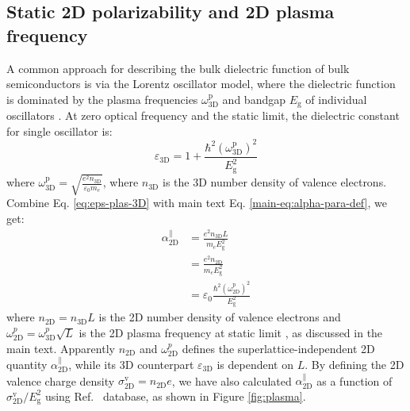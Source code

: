 \documentclass[manuscript=suppinfo,email=true,hyperref=true,keywords=false]{achemso}
\begin{document}
\subsection{Static 2D polarizability and 2D plasma frequency}
\label{ssec:omega-p}

A common approach for describing the bulk dielectric function of bulk
semiconductors is via the Lorentz oscillator model, where the
dielectric function is dominated by the plasma frequencies
$\omega_{\mathrm{3D}}^{\mathrm{p}}$ and bandgap $E_{\mathrm{g}}$ of
individual oscillators \cite{ketterson_physics_2016}. At zero optical
frequency and the static limit, the dielectric constant for single
oscillator is:
\begin{equation}
  \label{eq:eps-plas-3D}
  \varepsilon_{\mathrm{3D}} = 1 +
  \frac{\hbar^{2} (\omega_{\mathrm{3D}}^{\mathrm{p}})^{2}}{E_{\mathrm{g}}^{2}}
\end{equation}
where
$\omega_{\mathrm{3D}}^{\mathrm{p}} = {\displaystyle \sqrt{\frac{e^{2}
      n_{\mathrm{3D}}}{\varepsilon_{0} m_{e}}}}$, where
$n_{\mathrm{3D}}$ is the 3D number density of valence
electrons. Combine Eq. \ref{eq:eps-plas-3D} with main text
Eq. \ref{main-eq:alpha-para-def}, we get:
\begin{equation}
  \begin{aligned}
  \label{eq:alpha-plas}
  \alpha_{\mathrm{2D}}^{\parallel} &= \frac{e^{2} n_{\mathrm{3D}} L}{m_{e} E_{\mathrm{g}}^{2}} \\
  &= \frac{e^{2} n_{\mathrm{2D}}}{m_{e} E_{\mathrm{g}}^{2}} \\
  &= \varepsilon_{0} \frac{\hbar^{2}
    (\omega_{\mathrm{2D}}^{\mathrm{p}})^{2}}{E_{\mathrm{g}}^{2}}
\end{aligned}
\end{equation}
where $n_{\mathrm{2D}} =n_{\mathrm{3D}} L$ is the 2D number density of
valence electrons and
$\omega_{\mathrm{2D}}^{p}=\omega_{\mathrm{3D}}^{p}\sqrt{L}$ is the 2D
plasma frequency at static limit \cite{Nazarov_2015_2D_3D}, as
discussed in the main text. Apparently $n_{\mathrm{2D}}$ and
$\omega_{\mathrm{2D}}^{p}$ defines the superlattice-independent 2D
quantity $\alpha_{\mathrm{2D}}^{\parallel}$, while its 3D counterpart
$\varepsilon_{\mathrm{3D}}$ is dependent on $L$. By defining the 2D
valence charge density
$\sigma_{\mathrm{2D}}^{\mathrm{v}}=n_{\mathrm{2D}}e$, we have also
calculated $\alpha_{\mathrm{2D}}^{\parallel}$ as a function of
$\sigma_{\mathrm{2D}}^{\mathrm{v}}/E_{\mathrm{g}}^{2}$ using Ref.~ database, as shown in Figure \ref{fig:plasma}.
\end{document}
